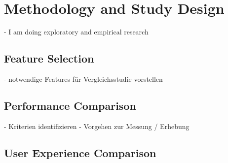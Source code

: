 \chapter{Methodology and Study Design}
- I am doing exploratory and empirical research

\section{Feature Selection} \label{section::feature_selection}
- notwendige Features für Vergleichsstudie vorstellen

\section{Performance Comparison} \label{section::performance_comparison_design}
- Kriterien identifizieren 
- Vorgehen zur Messung / Erhebung


\section{User Experience Comparison}
